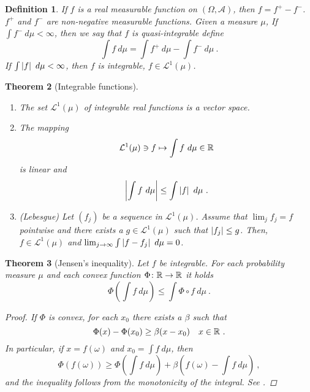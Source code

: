 \documentclass[12pt,a4paper]{amsart}
\theoremstyle{plain}
\newtheorem{theorem}{Theorem}%
\newtheorem{definition}[theorem]{Definition}%
\theoremstyle{definition}
\theoremstyle{remark}
\begin{document}
\begin{definition}
  If $f$ is a real measurable function on $(\Omega,\mathcal A)$, then
  $f = f^+ - f^-$. $f^+$ and $f^-$ are non-negative measurable
  functions. Given a measure $\mu$, If $\int f^- \ d\mu < \infty$,
  then we say that $f$ is \emph{quasi-integrable} define
  \begin{equation*}
    \int f \ d\mu = \int f^+ \ d\mu - \int f^- \ d\mu \ .
  \end{equation*}
If $\int \left\vert f\right\vert \ d\mu < \infty$, then $f$ is \emph{integrable}, $f
\in \mathcal L^1(\mu)$.
\end{definition}

\begin{theorem}[Integrable functions]\
  \begin{enumerate}
  \item The set $\mathcal L^1(\mu)$ of integrable real functions is a
    vector space.
  \item The mapping
    \begin{equation*}
      \mathcal L^1(\mu) \ni f \mapsto \int f \ d\mu \in \mathbb{R}
    \end{equation*}
is linear and
\begin{equation*}
  \left\vert\int f \ d\mu\right\vert \leq \int \left\vert f\right\vert \ d\mu \ .
\end{equation*}
\item (\emph{Lebesgue}) Let $(f_j)$ be a sequence in $\mathcal
  L^1(\mu)$. Assume that $\lim_j f_j = f$ pointwise and there exists a
  $g \in \mathcal L^1(\mu)$ such that $\left\vert f_j\right\vert \leq g$. Then, $f
  \in \mathcal L^1(\mu)$ and $\lim_{j\to\infty} \int \left\vert f - f_j\right\vert
  \ d\mu = 0$. 
  \end{enumerate}

\end{theorem}
\begin{theorem}[Jensen's inequality]
  Let $f$ be integrable. For each probability measure $\mu$ and
  each convex function $\Phi \colon \mathbb{R} \to \mathbb{R}$ it holds
  \begin{equation*}
    \Phi\left(\int f \ d\mu\right) \leq \int \Phi\circ f \ d\mu \ .
  \end{equation*}
  \begin{proof}
    If $\Phi$ is convex, for each $x_0$ there exists a $\beta$ such that
    \begin{equation*}
      \Phi(x) - \Phi(x_0) \geq \beta(x - x_0) \quad x \in \mathbb{R} \ .
    \end{equation*}
In particular, if $x = f(\omega)$ and $x_0 = \int f \ d\mu$, then
\begin{equation*}
  \Phi\left(f(\omega)\right) \geq \Phi\left( \int f \ d\mu\right) +
  \beta\left(f(\omega) - \int f \ d\mu\right) \ , 
\end{equation*}
and the inequality follows from the monotonicity of the integral. See
\cite[Th. 3.3]{rudin:1987-3rd}.
  \end{proof}
\end{theorem}


\end{document}
